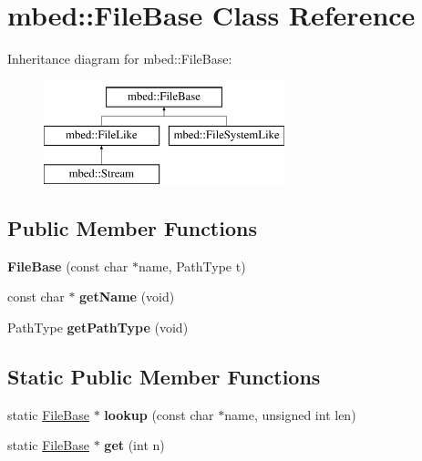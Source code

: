 \hypertarget{classmbed_1_1_file_base}{}\section{mbed\+:\+:File\+Base Class Reference}
\label{classmbed_1_1_file_base}
Inheritance diagram for mbed\+:\+:File\+Base\+:\begin{figure}[H]
\begin{center}
\leavevmode
\includegraphics[height=3.000000cm]{classmbed_1_1_file_base}
\end{center}
\end{figure}
\subsection*{Public Member Functions}
\begin{DoxyCompactItemize}
\item 
{\bfseries File\+Base} (const char $\ast$name, Path\+Type t)\hypertarget{classmbed_1_1_file_base_a8b19f5dfe489eaa641c32a5096c71af1}{}\label{classmbed_1_1_file_base_a8b19f5dfe489eaa641c32a5096c71af1}

\item 
const char $\ast$ {\bfseries get\+Name} (void)\hypertarget{classmbed_1_1_file_base_a9ead232b6645d7ebcf74b65d5ea78a35}{}\label{classmbed_1_1_file_base_a9ead232b6645d7ebcf74b65d5ea78a35}

\item 
Path\+Type {\bfseries get\+Path\+Type} (void)\hypertarget{classmbed_1_1_file_base_a59dd77df265c99a2fa0f7c209d0dba18}{}\label{classmbed_1_1_file_base_a59dd77df265c99a2fa0f7c209d0dba18}

\end{DoxyCompactItemize}
\subsection*{Static Public Member Functions}
\begin{DoxyCompactItemize}
\item 
static \hyperlink{classmbed_1_1_file_base}{File\+Base} $\ast$ {\bfseries lookup} (const char $\ast$name, unsigned int len)\hypertarget{classmbed_1_1_file_base_aa8d8002a2afa83b2e40909a4661f5de7}{}\label{classmbed_1_1_file_base_aa8d8002a2afa83b2e40909a4661f5de7}

\item 
static \hyperlink{classmbed_1_1_file_base}{File\+Base} $\ast$ {\bfseries get} (int n)\hypertarget{classmbed_1_1_file_base_ab7b3a4a842bbd739b49e87151421cc7d}{}\label{classmbed_1_1_file_base_ab7b3a4a842bbd739b49e87151421cc7d}

\end{DoxyCompactItemize}
